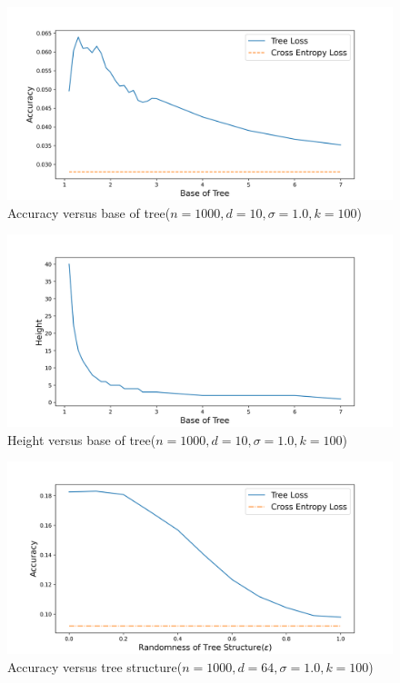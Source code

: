 \documentclass[twoside]{article}
\begin{document}
\begin{figure}[h]
\vspace{.3in}
\includegraphics[width=\linewidth]{fig/new_img/accuracy_vs_base.png}
\vspace{.3in}
\caption{\small Accuracy versus base of tree($n=1000, d=10, \sigma=1.0, k=100$)}
\label{accuracy_vs_base}
\end{figure}

\begin{figure}[h]
\vspace{.3in}
\includegraphics[width=\linewidth]{fig/new_img/height_vs_base.png}
\vspace{.3in}
\caption{\small Height versus base of tree($n=1000, d=10, \sigma=1.0, k=100$)}
\label{height_vs_base}
\end{figure}

\begin{figure}[h]
\vspace{.3in}
\includegraphics[width=\linewidth]{fig/new_img/loss_vs_structure.png}
\vspace{.3in}
\caption{\small Accuracy versus tree structure($n=1000, d=64, \sigma=1.0, k=100$)}
\label{accuracy_vs_structure}
\end{figure}
\end{document}
